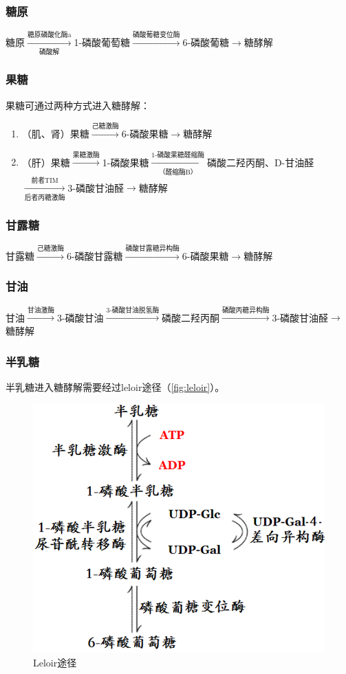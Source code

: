 \subsubsection{糖原}

糖原$\xrightarrow[\text{磷酸解}]{\text{糖原磷酸化酶a}}$1-磷酸葡萄糖$\xrightarrow{\text{磷酸葡糖变位酶}}$6-磷酸葡糖$\longrightarrow$糖酵解

\subsubsection{果糖}

果糖可通过两种方式进入糖酵解：
\begin{enumerate}
	\item （肌、肾）果糖$\xrightarrow{\text{己糖激酶}}$6-磷酸果糖$\longrightarrow$糖酵解
	\item （肝）果糖$\xrightarrow{\text{果糖激酶}}$1-磷酸果糖$\xrightarrow[\text{（醛缩酶B）}]{\text{1-磷酸果糖醛缩酶}}$磷酸二羟丙酮、D-甘油醛\\
	$\xrightarrow[\text{后者丙糖激酶}]{\text{前者TIM}}$3-磷酸甘油醛$\longrightarrow$糖酵解
\end{enumerate}

\subsubsection{甘露糖}

甘露糖$\xrightarrow{\text{己糖激酶}}$6-磷酸甘露糖$\xrightarrow{\text{磷酸甘露糖异构酶}}$6-磷酸果糖$\longrightarrow$糖酵解

\subsubsection{甘油}

甘油$\xrightarrow{\text{甘油激酶}}$3-磷酸甘油$\xrightarrow{\text{3-磷酸甘油脱氢酶}}$磷酸二羟丙酮$\xrightarrow{\text{磷酸丙糖异构酶}}$3-磷酸甘油醛$\longrightarrow$糖酵解

\subsubsection{半乳糖}

半乳糖进入糖酵解需要经过leloir途径（\autoref{fig:leloir}）。

\begin{figure}[htbp]
	\centering
	\includegraphics[width=0.4\linewidth]{Pics/Leloir途径}
	\caption{Leloir途径}
	\label{fig:leloir}
\end{figure}

